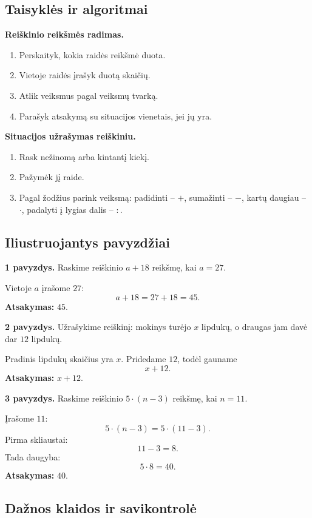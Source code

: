 \subsection{Taisyklės ir algoritmai}

\textbf{Reiškinio reikšmės radimas.}
\begin{enumerate}[label=\arabic*.]
\item Perskaityk, kokia raidės reikšmė duota.
\item Vietoje raidės įrašyk duotą skaičių.
\item Atlik veiksmus pagal veiksmų tvarką.
\item Parašyk atsakymą su situacijos vienetais, jei jų yra.
\end{enumerate}

\textbf{Situacijos užrašymas reiškiniu.}
\begin{enumerate}[label=\arabic*.]
\item Rask nežinomą arba kintantį kiekį.
\item Pažymėk jį raide.
\item Pagal žodžius parink veiksmą: padidinti -- \(+\), sumažinti -- \(-\), kartų daugiau -- \(\cdot\), padalyti į lygias dalis -- \(:\).
\end{enumerate}

\subsection{Iliustruojantys pavyzdžiai}

\textbf{1 pavyzdys.} Raskime reiškinio \(a+18\) reikšmę, kai \(a=27\).

Vietoje \(a\) įrašome \(27\):
\[
a+18=27+18=45.
\]
\textbf{Atsakymas:} \(45\).

\textbf{2 pavyzdys.} Užrašykime reiškinį: mokinys turėjo \(x\) lipdukų, o draugas jam davė dar \(12\) lipdukų.

Pradinis lipdukų skaičius yra \(x\). Pridedame \(12\), todėl gauname
\[
x+12.
\]
\textbf{Atsakymas:} \(x+12\).

\textbf{3 pavyzdys.} Raskime reiškinio \(5\cdot(n-3)\) reikšmę, kai \(n=11\).

Įrašome \(11\):
\[
5\cdot(n-3)=5\cdot(11-3).
\]
Pirma skliaustai:
\[
11-3=8.
\]
Tada daugyba:
\[
5\cdot8=40.
\]
\textbf{Atsakymas:} \(40\).

\subsection{Dažnos klaidos ir savikontrolė}


